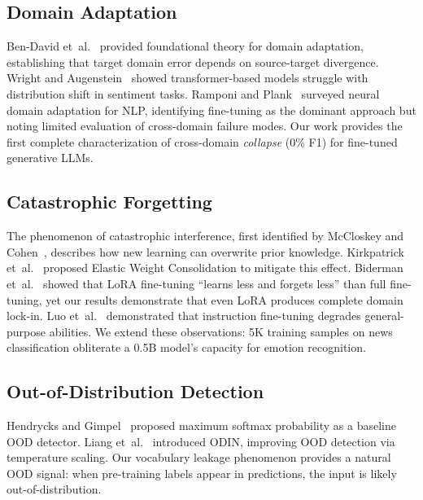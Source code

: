 \documentclass[journal]{IEEEtran}
\begin{document}
\subsection{Domain Adaptation}
Ben-David et~al.~\cite{bendavid2010} provided foundational theory for domain adaptation, establishing that target domain error depends on source-target divergence. Wright and Augenstein~\cite{wright2020} showed transformer-based models struggle with distribution shift in sentiment tasks. Ramponi and Plank~\cite{ramponi2020} surveyed neural domain adaptation for NLP, identifying fine-tuning as the dominant approach but noting limited evaluation of cross-domain failure modes. Our work provides the first complete characterization of cross-domain \emph{collapse} (0\% F1) for fine-tuned generative LLMs.

\subsection{Catastrophic Forgetting}
The phenomenon of catastrophic interference, first identified by McCloskey and Cohen~\cite{mccloskey1989}, describes how new learning can overwrite prior knowledge. Kirkpatrick et~al.~\cite{kirkpatrick2017} proposed Elastic Weight Consolidation to mitigate this effect. Biderman et~al.~\cite{biderman2024} showed that LoRA fine-tuning ``learns less and forgets less'' than full fine-tuning, yet our results demonstrate that even LoRA produces complete domain lock-in. Luo et~al.~\cite{luo2023} demonstrated that instruction fine-tuning degrades general-purpose abilities. We extend these observations: 5K training samples on news classification obliterate a 0.5B model's capacity for emotion recognition.

\subsection{Out-of-Distribution Detection}
Hendrycks and Gimpel~\cite{hendrycks2017} proposed maximum softmax probability as a baseline OOD detector. Liang et~al.~\cite{liang2018} introduced ODIN, improving OOD detection via temperature scaling. Our vocabulary leakage phenomenon provides a natural OOD signal: when pre-training labels appear in predictions, the input is likely out-of-distribution.
\end{document}
